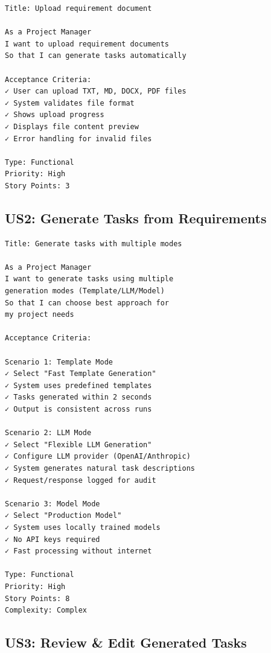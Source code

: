 \documentclass[12pt, a4paper]{report}
\begin{document}
\begin{tcolorbox}[colback=cyan!5, colframe=cyan!50]
\begin{lstlisting}
Title: Upload requirement document

As a Project Manager
I want to upload requirement documents
So that I can generate tasks automatically

Acceptance Criteria:
✓ User can upload TXT, MD, DOCX, PDF files
✓ System validates file format
✓ Shows upload progress
✓ Displays file content preview
✓ Error handling for invalid files

Type: Functional
Priority: High
Story Points: 3
\end{lstlisting}
\end{tcolorbox}

\subsection{US2: Generate Tasks from Requirements}

\begin{tcolorbox}[colback=orange!5, colframe=orange!50]
\begin{lstlisting}
Title: Generate tasks with multiple modes

As a Project Manager
I want to generate tasks using multiple 
generation modes (Template/LLM/Model)
So that I can choose best approach for 
my project needs

Acceptance Criteria:

Scenario 1: Template Mode
✓ Select "Fast Template Generation"
✓ System uses predefined templates
✓ Tasks generated within 2 seconds
✓ Output is consistent across runs

Scenario 2: LLM Mode
✓ Select "Flexible LLM Generation"
✓ Configure LLM provider (OpenAI/Anthropic)
✓ System generates natural task descriptions
✓ Request/response logged for audit

Scenario 3: Model Mode
✓ Select "Production Model"
✓ System uses locally trained models
✓ No API keys required
✓ Fast processing without internet

Type: Functional
Priority: High
Story Points: 8
Complexity: Complex
\end{lstlisting}
\end{tcolorbox}

\subsection{US3: Review \& Edit Generated Tasks}
\end{document}
